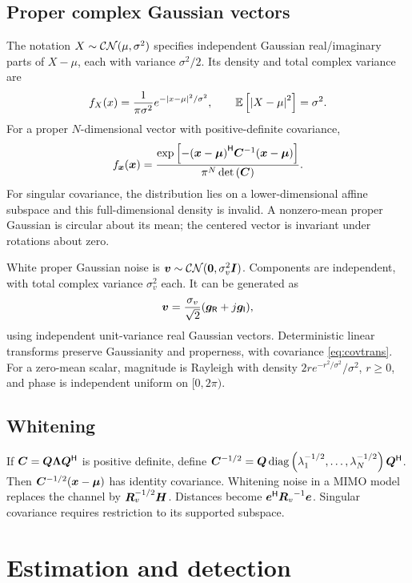 \subsection{Proper complex Gaussian vectors}
The notation $X\sim\mathcal{CN}(\mu,\sigma^2)$ specifies independent Gaussian real/imaginary parts of $X-\mu$, each with variance $\sigma^2/2$. Its density and total complex variance are
\begin{equation}
f_X(x)=\frac{1}{\pi\sigma^2}e^{-\left|x-\mu\right|^2/\sigma^2},\qquad
\mathbb{E}\left[\left|X-\mu\right|^2\right]=\sigma^2.
\end{equation}
For a proper $N$-dimensional vector with positive-definite covariance,
\begin{equation}
f_{\bm{x}}(\bm{x})=
\frac{\exp\left[-{(\bm{x}-\bm{\mu})}^{\mathsf{H}}{\bm{C}}^{-1}(\bm{x}-\bm{\mu})\right]}
{\pi^N\operatorname{det}\left(\bm{C}\right)}.
\end{equation}
For singular covariance, the distribution lies on a lower-dimensional affine subspace and this full-dimensional density is invalid. A nonzero-mean proper Gaussian is circular about its mean; the centered vector is invariant under rotations about zero.

White proper Gaussian noise is $\bm{v}\sim\mathcal{CN}(\bm{0},\sigma_v^2\bm{I})$. Components are independent, with total complex variance $\sigma_v^2$ each. It can be generated as
\begin{equation}
\bm{v}=\frac{\sigma_v}{\sqrt2}(\bm{g}_{\mathsf R}+j\bm{g}_{\mathsf I}),
\end{equation}
using independent unit-variance real Gaussian vectors. Deterministic linear transforms preserve Gaussianity and properness, with covariance \eqref{eq:covtrans}. For a zero-mean scalar, magnitude is Rayleigh with density $2r e^{-r^2/\sigma^2}/\sigma^2$, $r\geq0$, and phase is independent uniform on $[0,2\pi)$.

\subsection{Whitening}
If $\bm{C}=\bm{Q}\bm{\Lambda}{\bm{Q}}^{\mathsf{H}}$ is positive definite, define $\bm{C}^{-1/2}=\bm{Q}\operatorname{diag}\left(\lambda_1^{-1/2},\ldots,\lambda_N^{-1/2}\right){\bm{Q}}^{\mathsf{H}}$. Then $\bm{C}^{-1/2}(\bm{x}-\bm{\mu})$ has identity covariance. Whitening noise in a MIMO model replaces the channel by $\bm{R}_v^{-1/2}\bm{H}$. Distances become ${\bm{e}}^{\mathsf{H}}{\bm{R}_v}^{-1}\bm{e}$. Singular covariance requires restriction to its supported subspace.

\section{Estimation and detection}\label{app:estimation}
